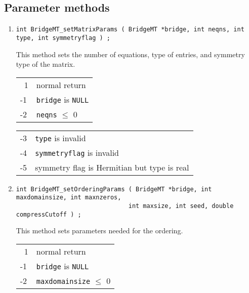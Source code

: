 \subsection{Parameter methods}
\label{subsection:BridgeMT:proto:parameters}
\par
\begin{enumerate}
\item
\begin{verbatim}
int BridgeMT_setMatrixParams ( BridgeMT *bridge, int neqns, int type, int symmetryflag ) ;
\end{verbatim}
This method sets the number of equations, type of entries, 
and symmetry type of the matrix.
\par {}
\begin{center}
\begin{tabular}{ll}
~1 & normal return \\
-1 & \texttt{bridge} is \texttt{NULL} \\
-2 & \texttt{neqns} $\le$ 0
\end{tabular}
\begin{tabular}{ll}
-3 & \texttt{type} is invalid \\
-4 & \texttt{symmetryflag} is invalid \\
-5 & symmetry flag is Hermitian but type is real
\end{tabular}
\end{center}
\item
\begin{verbatim}
int BridgeMT_setOrderingParams ( BridgeMT *bridge, int maxdomainsize, int maxnzeros, 
                               int maxsize, int seed, double compressCutoff ) ;
\end{verbatim}
This method sets parameters needed for the ordering.
\par {}
\begin{center}
\begin{tabular}{ll}
~1 & normal return \\
-1 & \texttt{bridge} is \texttt{NULL} \\
-2 & \texttt{maxdomainsize} $\le$ 0
\end{tabular}

\end{center}
\end{enumerate}

